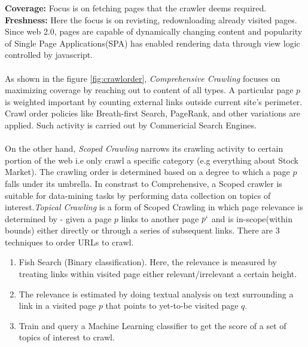 \noindent
\textbf{Coverage:} Focus is on fetching pages that the crawler deems required. 
\\
\textbf{Freshness:} Here the focus is on revisting, redownloading already visited pages. Since web 2.0,
pages are capable of dynamically changing content and popularity of Single Page Applications(SPA) has
enabled rendering data through view logic controlled by javascript.
\\
\\
As shown in the figure \ref{fig:crawlorder}, \textit{Comprehensive Crawling}\cite{trends} focuses on maximizing coverage by reaching out to content of all types.
A particular page $p$ is weighted important by counting external links outside current site's perimeter. Crawl order policies like Breath-first Search, PageRank, and other variations are applied. Such activity
is carried out by Commericial Search Engines.
\\
\\
On the other hand, \textit{Scoped Crawling}\cite{trends} narrows its
crawling activity to certain portion of the web i.e only crawl a specific category (e.g everything about Stock Market). The crawling order is determined based on a degree to which a page $p$ falls under its umbrella.
In constrast to Comprehensive, a Scoped crawler is suitable for data-mining tasks by performing
data collection on topics of interest.\textit{Topical Crawling}\cite{trends} is a form of Scoped Crawling in which page relevance is determined by - given a  page $p$ links to another page $p`$ and is in-scope(within bounds) either directly or through a series of subsequent links. There are 3 techniques to order URLs to crawl.

\begin{enumerate}
\item Fish Search (Binary classification). Here, the relevance is measured by treating links within visited
  page either relevant/irrelevant a certain height.
\item The relevance is estimated by doing textual analysis on text surrounding a link in a visited page $p$
  that points to yet-to-be visited page $q$.
\item Train and query a Machine Learning classifier to get the score of a set of topics of interest to crawl.
\end{enumerate}

